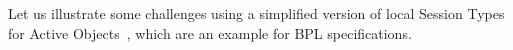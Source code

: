 Let us illustrate some challenges using a simplified version of local Session Types for Active Objects~\cite{DBLP:journals/jacm/HondaYC16,DBLP:journals/csur/BoerSHHRDJSKFY17,DBLP:conf/ifm/KamburjanC18}, which are an example for BPL specifications.

\begin{example}
\end{example}






